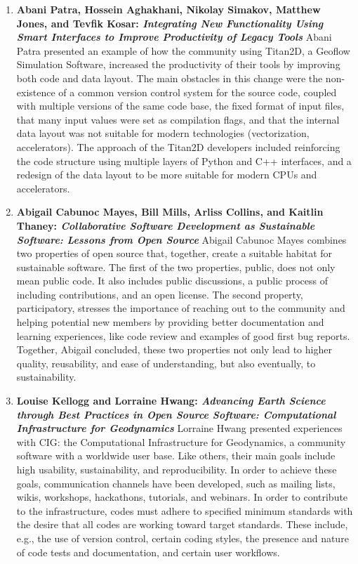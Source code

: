 \documentclass[11pt, oneside]{amsart}
\begin{document}
\begin{enumerate}
\item \textbf{Abani Patra, Hossein Aghakhani, Nikolay Simakov, Matthew Jones,
and Tevfik Kosar: \textit{Integrating New Functionality Using Smart Interfaces
to Improve Productivity of Legacy Tools}} Abani Patra presented an example of
how the community using Titan2D, a Geoflow Simulation Software, increased the
productivity of their tools by improving both code and data layout. The main
obstacles in this change were the non-existence of a common version control
system for the source code, coupled with multiple versions of the same code
base, the fixed format of input files, that many input values were set as
compilation flags, and that the internal data layout was not suitable for modern
technologies (vectorization, accelerators). The approach of the Titan2D
developers included reinforcing the code structure using multiple layers of
Python and C++ interfaces, and a redesign of the data layout to be more suitable
for modern CPUs and accelerators.

\item \textbf{Abigail Cabunoc Mayes, Bill Mills, Arliss Collins, and Kaitlin
Thaney: \textit{Collaborative Software Development as Sustainable Software:
Lessons from Open Source}} Abigail Cabunoc Mayes combines two properties of open
source that, together, create a suitable habitat for sustainable software. The
first of the two properties, public, does not only mean public code. It also
includes public discussions, a public process of including contributions, and an
open license. The second property, participatory, stresses the importance of
reaching out to the community and helping potential new members by providing
better documentation and learning experiences, like code review and examples of
good first bug reports. Together, Abigail concluded, these two properties not
only lead to higher quality, reusability, and ease of understanding, but also
eventually, to sustainability.

\item \textbf{Louise Kellogg and Lorraine Hwang: \textit{Advancing Earth Science
through Best Practices in Open Source Software: Computational Infrastructure for
Geodynamics}} Lorraine Hwang presented experiences with CIG: the Computational
Infrastructure for Geodynamics, a community software with a worldwide user base.
Like others, their main goals include high usability, sustainability, and
reproducibility. In order to achieve these goals, communication channels have
been developed, such as mailing lists, wikis, workshops, hackathons, tutorials,
and webinars. In order to contribute to the infrastructure, codes must adhere
to specified minimum standards with the desire that all codes are working toward target standards.
These include, e.g., the use of version control,
certain coding styles, the presence and nature of code tests and documentation,
and certain user workflows.


\end{enumerate}
\end{document}
